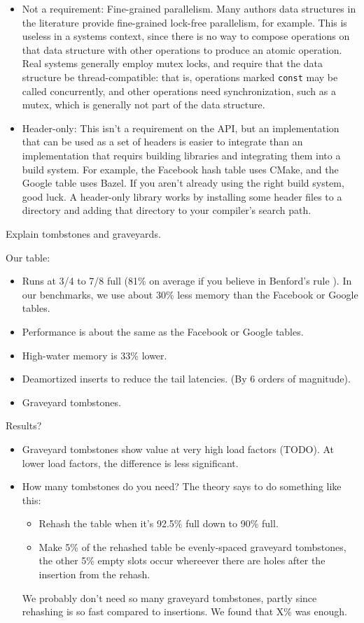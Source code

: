\documentclass[10pt]{article}
\theoremstyle{remark}
\theoremstyle{remark}
\begin{document}
\begin{itemize}
\item Not a requirement: Fine-grained parallelism.  Many authors data
  structures in the literature provide fine-grained lock-free
  parallelism, for example.  This is useless in a systems context,
  since there is no way to compose operations on that data structure
  with other operations to produce an atomic operation.  Real systems
  generally employ mutex locks, and require that the data structure be
  thread-compatible: that is, operations marked \texttt{const} may be
  called concurrently, and other operations need synchronization, such
  as a mutex, which is generally not part of the data structure.

\item Header-only: This isn't a requirement on the API, but an
  implementation that can be used as a set of headers is easier to
  integrate than an implementation that requirs building libraries and
  integrating them into a build system.  For example, the Facebook
  hash table uses CMake, and the Google table uses Bazel.  If you
  aren't already using the right build system, good luck.  A
  header-only library works by installing some header files to a
  directory and adding that directory to your compiler's search path.
\end{itemize}

Explain tombstones and graveyards.

Our table:
\begin{itemize}
\item Runs at 3/4 to 7/8 full (81\% on average if you believe in
  Benford's rule \cite{Benford38}).  In our benchmarks, we use about 30\% less memory
  than the Facebook or Google tables.
\item Performance is about the same as the Facebook or Google tables.
\item High-water memory is 33\% lower.
\item Deamortized inserts to reduce the tail latencies.  (By 6 orders
  of magnitude).
\item Graveyard tombstones.
\end{itemize}

Results?
\begin{itemize}
  \item Graveyard tombstones show value at very high load factors (TODO).  At
    lower load factors, the difference is less significant.  
  \item How many tombstones do you need?  The theory says to do something like this:
    \begin{itemize}
    \item Rehash the table when it's 92.5\% full down to 90\% full.
    \item Make 5\% of the rehashed table be evenly-spaced graveyard
      tombstones, the other 5\% empty slots occur whereever there are
      holes after the insertion from the rehash.
    \end{itemize}
    We probably don't need so many graveyard tombstones, partly since
    rehashing is so fast compared to insertions.  We found that X\%
    was enough.
\end{itemize}
\end{document}
